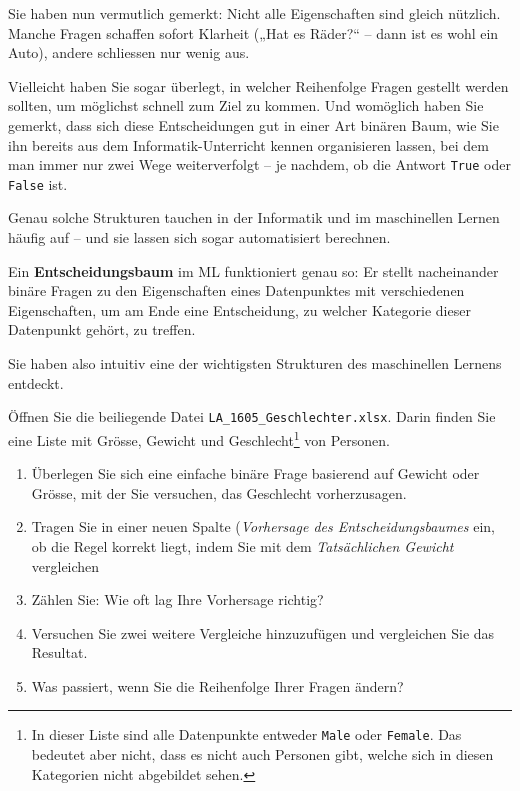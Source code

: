 \begin{lpu}
Sie haben nun vermutlich gemerkt: Nicht alle Eigenschaften sind gleich nützlich. Manche Fragen schaffen sofort Klarheit („Hat es Räder?“ – dann ist es wohl ein Auto), andere schliessen nur wenig aus.

Vielleicht haben Sie sogar überlegt, in welcher Reihenfolge Fragen gestellt werden sollten, um möglichst schnell zum Ziel zu kommen. Und womöglich haben Sie gemerkt, dass sich diese Entscheidungen gut in einer Art binären Baum, wie Sie ihn bereits aus dem Informatik-Unterricht kennen organisieren lassen, bei dem man immer nur zwei Wege weiterverfolgt – je nachdem, ob die Antwort \texttt{True} oder \texttt{False} ist.

Genau solche Strukturen tauchen in der Informatik und im maschinellen Lernen häufig auf – und sie lassen sich sogar automatisiert berechnen.

\begin{theorie}
Ein \textbf{Entscheidungsbaum} im ML funktioniert genau so: Er stellt nacheinander binäre Fragen zu den Eigenschaften eines Datenpunktes mit verschiedenen Eigenschaften, um am Ende eine Entscheidung, zu welcher Kategorie dieser Datenpunkt gehört, zu treffen.
\end{theorie}

Sie haben also intuitiv eine der wichtigsten Strukturen des maschinellen Lernens entdeckt.


\begin{aufgabe}{4}
Öffnen Sie die beiliegende Datei \texttt{LA\_1605\_Geschlechter.xlsx}. Darin finden Sie eine Liste mit Grösse, Gewicht und Geschlecht\footnote{In dieser Liste sind alle Datenpunkte entweder \texttt{Male} oder \texttt{Female}. Das bedeutet aber nicht, dass es nicht auch Personen gibt, welche sich in diesen Kategorien nicht abgebildet sehen.} von Personen.

\begin{enumerate}
  \item Überlegen Sie sich eine einfache binäre Frage basierend auf Gewicht oder Grösse, mit der Sie versuchen, das Geschlecht vorherzusagen.
  \item Tragen Sie in einer neuen Spalte (\textit{Vorhersage des Entscheidungsbaumes} ein, ob die Regel korrekt liegt, indem Sie mit dem \textit{Tatsächlichen Gewicht} vergleichen
  \item Zählen Sie: Wie oft lag Ihre Vorhersage richtig?
  \item Versuchen Sie zwei weitere Vergleiche hinzuzufügen und vergleichen Sie das Resultat.
  \item Was passiert, wenn Sie die Reihenfolge Ihrer Fragen ändern?
\end{enumerate}
\end{aufgabe}


\end{lpu}

